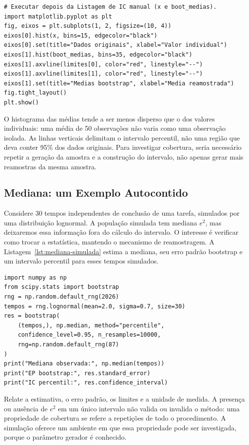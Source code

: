 \documentclass[12pt,a4paper]{article}
\begin{document}
\begin{lstlisting}[caption={Visualizacao dos dados e das medias bootstrap.},label={lst:visualizacao-medias}]
# Executar depois da Listagem de IC manual (x e boot_medias).
import matplotlib.pyplot as plt
fig, eixos = plt.subplots(1, 2, figsize=(10, 4))
eixos[0].hist(x, bins=15, edgecolor="black")
eixos[0].set(title="Dados originais", xlabel="Valor individual")
eixos[1].hist(boot_medias, bins=35, edgecolor="black")
eixos[1].axvline(limites[0], color="red", linestyle="--")
eixos[1].axvline(limites[1], color="red", linestyle="--")
eixos[1].set(title="Medias bootstrap", xlabel="Media reamostrada")
fig.tight_layout()
plt.show()
\end{lstlisting}
O histograma das médias tende a ser menos disperso que o dos valores individuais: uma média de 50 observações não varia como uma observação isolada. As linhas verticais delimitam o intervalo percentil, não uma região que deva conter 95\% dos dados originais. Para investigar cobertura, seria necessário repetir a geração da amostra e a construção do intervalo, não apenas gerar mais reamostras da mesma amostra.

\subsection{Mediana: um Exemplo Autocontido}
Considere 30 tempos independentes de conclusão de uma tarefa, simulados por uma distribuição lognormal. A população simulada tem mediana $e^2$, mas deixaremos essa informação fora do cálculo do intervalo. O interesse é verificar como trocar a estatística, mantendo o mecanismo de reamostragem. A Listagem~\ref{lst:mediana-simulada} estima a mediana, seu erro padrão bootstrap e um intervalo percentil para esses tempos simulados.

\begin{lstlisting}[caption={Intervalo e erro padrao para uma mediana.},label={lst:mediana-simulada}]
import numpy as np
from scipy.stats import bootstrap
rng = np.random.default_rng(2026)
tempos = rng.lognormal(mean=2.0, sigma=0.7, size=30)
res = bootstrap(
    (tempos,), np.median, method="percentile",
    confidence_level=0.95, n_resamples=10000,
    rng=np.random.default_rng(87)
)
print("Mediana observada:", np.median(tempos))
print("EP bootstrap:", res.standard_error)
print("IC percentil:", res.confidence_interval)
\end{lstlisting}
Relate a estimativa, o erro padrão, os limites e a unidade de medida. A presença ou ausência de $e^2$ em um único intervalo não valida ou invalida o método: uma propriedade de cobertura se refere a repetições de todo o procedimento. A simulação oferece um ambiente em que essa propriedade pode ser investigada, porque o parâmetro gerador é conhecido.
\end{document}

